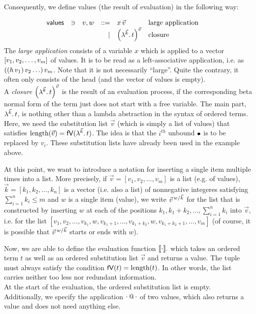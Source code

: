\documentclass[submission,copyright,creativecommons]{eptcs}
\begin{document}
Consequently, we define values (the result of evaluation) in the following way:

\[ 
\begin{array}{lllrll@{\qquad}}
\mathsf{values}       & \ni & v,w & ::= & x \sspace \vec v & \mbox{large application} \\ 
			                   &&& \mid & \Val {\vec k} t {\vec v} & \mbox{closure} \\ 
\end{array}
\]
The \emph{large application} consists of a variable $x$ which is applied to a vector $\ve{v_1, v_2, \ldots, v_m}$ of values. It is to be read as a left-associative application, i.e. as $\pa{\pa{h \, v_1} v_2 \ldots } v_m$. 
Note that it is not necessarily ``large''. Quite the contrary, it often only consists of the head (and the vector of values is empty).\\
A \emph{closure} $\Val {\vec k} t {\vec v}$ is the result of an evaluation process, if the corresponding beta normal form of the term just does not start with a free variable. The main part, $\LaO {\vec k} t$, is nothing other than a lambda abstraction in the syntax of ordered terms.
Here, we need the substitution list $\vec v$ (which is simply a list of values) that satisfies $\length {\vec v} = \freevars{\LaO {\vec k} t}$. %
The idea is that the $i^{th}$ unbound $\ovar$ is to be replaced by $v_i$.  These substitution lists have already been used in the example above.


At this point, we want to introduce a notation for inserting a single item multiple times into a list. More precisely, if $\vec v = [v_1, v_2, \ldots, v_m]$ is a list (e.g. of values), $\vec k = [k_1, k_2, \ldots, k_n]$ is a vector (i.e. also a list) of  nonnegative integeres satisfying $\sum_{i=1}^n k_i \leq m$ and $w$ is a single item (value), we write $\multiinsert {\vec v} {\vec k} {w}$  for the list that is constructed by inserting $w$ at each of the positions $k_1, k_1 + k_2, \ldots, \sum_{i=1}^n k_i$ into $\vec v$, i.e. for the list $[v_1, v_2, \ldots, v_{k_1}, w, v_{k_1 + 1}, \ldots, v_{k_1 + k_2}, w, v_{k_1 + k_2 + 1}, \ldots, v_m]$ (of course, it is possible that $\multiinsert {\vec v} {\vec k} {w}$ starts or ends with $w$).


Now, we are able to define the evaluation function $\ev {\cdot} {\cdot}$ which takes an ordered term $t$ as well as an ordered substitution list $\vec v$ and returns a value. The tuple must always satisfy the condition $\freevars t = \length t$. In other words, the list carries neither too less nor redundant information.\\
At the start of the evaluation, the ordered substitution list is empty. \\
Additionally, we specify the application $\cdot \ap \cdot$ of two values, which also returns a value and does not need anything else.
\end{document}
